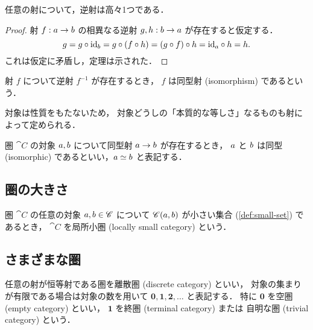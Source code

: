 \documentclass[titlepage]{ltjsreport}
\begin{document}
\begin{theorem}[逆射の一意性]
  任意の射について，逆射は高々1つである．
\end{theorem}

\begin{proof}
  \def\a{\obj{a}}%
  \def\b{\obj{b}}%
  射 $\mrp{f}{\a}{\b}$ の相異なる逆射 $\mrp{g,h}{\b}{\a}$ が存在すると仮定する．
  \begin{equation*}
    g=g\circ\id{\b}=g\circ(f\circ h)=(g\circ f)\circ h=\id{\a}\circ h=h.
  \end{equation*}
  これは仮定に矛盾し，定理は示された．
\end{proof}

\begin{definition}[同型射]
  射 $f$ について逆射 $f^{-1}$ が存在するとき，
  $f$ は同型射 (isomorphism) であるという．
\end{definition}

対象は性質をもたないため，
対象どうしの「本質的な等しさ」なるものも射によって定められる．

\begin{definition}[同型]
  \def\a{\obj{a}}%
  \def\b{\obj{b}}%
  圏 $\cat{C}$ の対象 $\a,\b$ について同型射 $\a\to\b$ が存在するとき，
  $\a$ と $\b$ は同型 (isomorphic) であるといい，$\a\simeq\b$ と表記する．
\end{definition}

\subsection{圏の大きさ}

\begin{definition}[局所小圏]
  \def\C{\cat{C}}%
  \def\a{\obj{a}}%
  \def\b{\obj{b}}%
  圏 $\C$ の任意の対象 $\a,\b\in\C$ について
  $\mrps{\C}{\a}{\b}$ が小さい集合 (\cref{def:small-set}) であるとき，
  $\C$ を局所小圏 (locally small category) という．
\end{definition}

\subsection{さまざまな圏}

\begin{definition}[離散圏]
  任意の射が恒等射である圏を離散圏 (discrete category) といい，
  対象の集まりが有限である場合は対象の数を用いて
  $\mathbf{0},\mathbf{1},\mathbf{2},\ldots$ と表記する．
  特に $\mathbf{0}$ を空圏 (empty category) といい，
  $\mathbf{1}$ を終圏 (terminal category) または
  自明な圏 (trivial category) という．
\end{definition}
\end{document}
